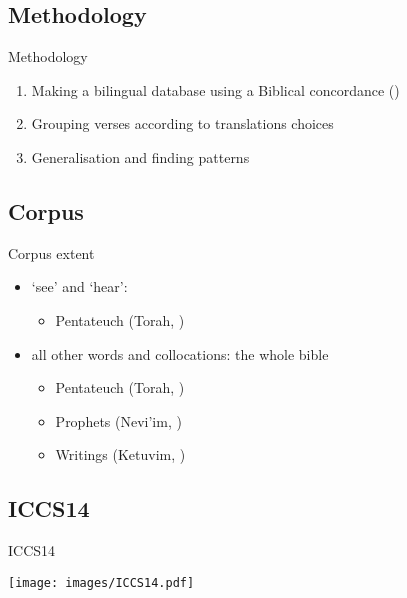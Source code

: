 \subsection{Methodology}

\begin{frame}{Methodology}
	\begin{enumerate}
		\item Making a bilingual database using a Biblical concordance (\cite{even-shoshan.a:1977:concordance})
		\item Grouping verses according to translations choices
		\item Generalisation and finding patterns
	\end{enumerate}
\end{frame}






\subsection{Corpus}

\begin{frame}{Corpus extent}
	\begin{itemize}
		\item {} ‘see’ and  ‘hear’:
			\begin{itemize}
				\item {Pentateuch \quad\scriptsize (Torah, )}
			\end{itemize}
		\item all other words and collocations: the whole bible
			\begin{itemize}
				\item {Pentateuch \quad\scriptsize (Torah, )}
				\item {Prophets \quad\scriptsize (Nevi’im, )}
				\item {Writings \quad\scriptsize (Ketuvim, )}
			\end{itemize}
	\end{itemize}
\end{frame}



\subsection{ICCS14}

\begin{frame}{ICCS14}
	\begin{center}
		\texttt{[image: images/ICCS14.pdf]}
	\end{center}
\end{frame}
